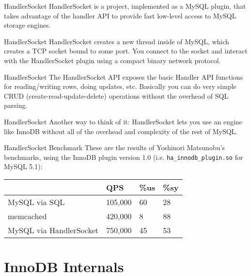 \documentclass[14pt]{beamer}
\begin{document}
\begin{frame}{HandlerSocket}
  HandlerSocket is a project, implemented as a MySQL plugin, that takes
  advantage of the handler API to provide fast low-level access to MySQL storage
  engines.
\end{frame}

\begin{frame}{HandlerSocket}
  HandlerSocket creates a new thread inside of MySQL, which creates a TCP socket
  bound to some port.
  \newline
  \newline
  You connect to the socket and interact with the HandlerSocket plugin using a
  compact binary network protocol.
\end{frame}

\begin{frame}{HandlerSocket}
  The HandlerSocket API exposes the basic Handler API functions for
  reading/writing rows, doing updates, etc.
  \newline
  \newline
  Basically you can do very simple CRUD (create-read-update-delete) operations
  without the overhead of SQL parsing.
\end{frame}

\begin{frame}{HandlerSocket}
  Another way to think of it: HandlerSocket lets you use an engine like InnoDB
  without all of the overhead and complexity of the rest of MySQL.
\end{frame}

\begin{frame}{HandlerSocket Benchmark}
  These are the results of Yoshinori Matsunobu's benchmarks, using the InnoDB
  plugin version 1.0 (i.e. \texttt{ha\_innodb\_plugin.so} for MySQL 5.1):
  \begin{table}[ht]
    \begin{tabular}{l l l l}
                              & QPS     & \%us & \%sy \\ \hline
      MySQL via SQL           & 105,000 & 60   & 28   \\
      memcached               & 420,000 & 8    & 88   \\
      MySQL via HandlerSocket & 750,000 & 45   & 53   \\
    \end{tabular}
  \end{table}
\end{frame}

\section{InnoDB Internals}
\end{document}
